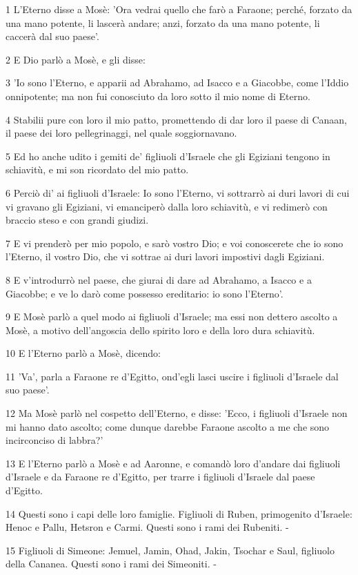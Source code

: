 \par 1 L'Eterno disse a Mosè: 'Ora vedrai quello che farò a Faraone; perché, forzato da una mano potente, li lascerà andare; anzi, forzato da una mano potente, li caccerà dal suo paese'.
\par 2 E Dio parlò a Mosè, e gli disse:
\par 3 'Io sono l'Eterno, e apparii ad Abrahamo, ad Isacco e a Giacobbe, come l'Iddio onnipotente; ma non fui conosciuto da loro sotto il mio nome di Eterno.
\par 4 Stabilii pure con loro il mio patto, promettendo di dar loro il paese di Canaan, il paese dei loro pellegrinaggi, nel quale soggiornavano.
\par 5 Ed ho anche udito i gemiti de' figliuoli d'Israele che gli Egiziani tengono in schiavitù, e mi son ricordato del mio patto.
\par 6 Perciò di' ai figliuoli d'Israele: Io sono l'Eterno, vi sottrarrò ai duri lavori di cui vi gravano gli Egiziani, vi emanciperò dalla loro schiavitù, e vi redimerò con braccio steso e con grandi giudizi.
\par 7 E vi prenderò per mio popolo, e sarò vostro Dio; e voi conoscerete che io sono l'Eterno, il vostro Dio, che vi sottrae ai duri lavori impostivi dagli Egiziani.
\par 8 E v'introdurrò nel paese, che giurai di dare ad Abrahamo, a Isacco e a Giacobbe; e ve lo darò come possesso ereditario: io sono l'Eterno'.
\par 9 E Mosè parlò a quel modo ai figliuoli d'Israele; ma essi non dettero ascolto a Mosè, a motivo dell'angoscia dello spirito loro e della loro dura schiavitù.
\par 10 E l'Eterno parlò a Mosè, dicendo:
\par 11 'Va', parla a Faraone re d'Egitto, ond'egli lasci uscire i figliuoli d'Israele dal suo paese'.
\par 12 Ma Mosè parlò nel cospetto dell'Eterno, e disse: 'Ecco, i figliuoli d'Israele non mi hanno dato ascolto; come dunque darebbe Faraone ascolto a me che sono incirconciso di labbra?'
\par 13 E l'Eterno parlò a Mosè e ad Aaronne, e comandò loro d'andare dai figliuoli d'Israele e da Faraone re d'Egitto, per trarre i figliuoli d'Israele dal paese d'Egitto.
\par 14 Questi sono i capi delle loro famiglie. Figliuoli di Ruben, primogenito d'Israele: Henoc e Pallu, Hetsron e Carmi. Questi sono i rami dei Rubeniti. -
\par 15 Figliuoli di Simeone: Jemuel, Jamin, Ohad, Jakin, Tsochar e Saul, figliuolo della Cananea. Questi sono i rami dei Simeoniti. -
